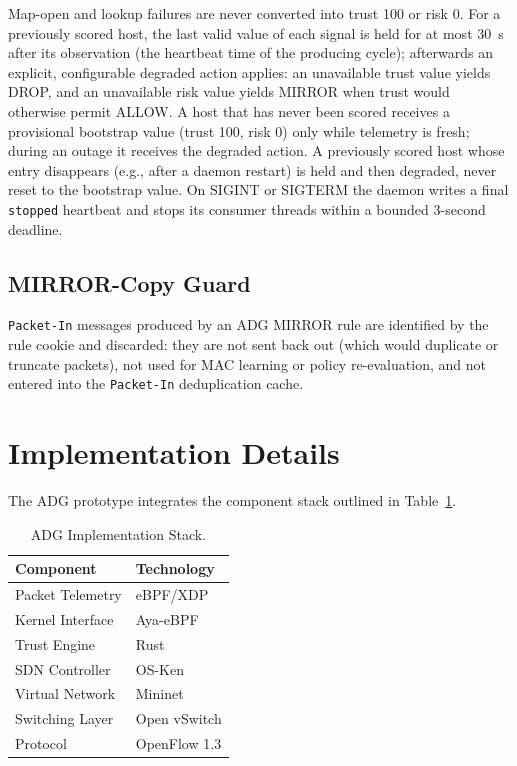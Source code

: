 \documentclass[conference]{IEEEtran}
\begin{document}
Map-open and lookup failures are never converted into trust 100 or risk 0. For a previously scored host, the last valid value of each signal is held for at most 30~s after its observation (the heartbeat time of the producing cycle); afterwards an explicit, configurable degraded action applies: an unavailable trust value yields DROP, and an unavailable risk value yields MIRROR when trust would otherwise permit ALLOW. A host that has never been scored receives a provisional bootstrap value (trust 100, risk 0) only while telemetry is fresh; during an outage it receives the degraded action. A previously scored host whose entry disappears (e.g., after a daemon restart) is held and then degraded, never reset to the bootstrap value. On SIGINT or SIGTERM the daemon writes a final \texttt{stopped} heartbeat and stops its consumer threads within a bounded 3-second deadline.

\subsection{MIRROR-Copy Guard}
\label{sec:mirror_guard}
\texttt{Packet-In} messages produced by an ADG MIRROR rule are identified by the rule cookie and discarded: they are not sent back out (which would duplicate or truncate packets), not used for MAC learning or policy re-evaluation, and not entered into the \texttt{Packet-In} deduplication cache.


\section{Implementation Details}

The ADG prototype integrates the component stack outlined in Table~\ref{tab:stack}.

\begin{table}[h]
\centering
\caption{ADG Implementation Stack.}
\label{tab:stack}
\begin{tabular}{ll}
\toprule
Component & Technology \\
\midrule
Packet Telemetry & eBPF/XDP \\
Kernel Interface & Aya-eBPF~\cite{aya2024} \\
Trust Engine & Rust \\
SDN Controller & OS-Ken \\
Virtual Network & Mininet \\
Switching Layer & Open vSwitch \\
Protocol & OpenFlow 1.3 \\
\bottomrule
\end{tabular}
\end{table}
\end{document}
